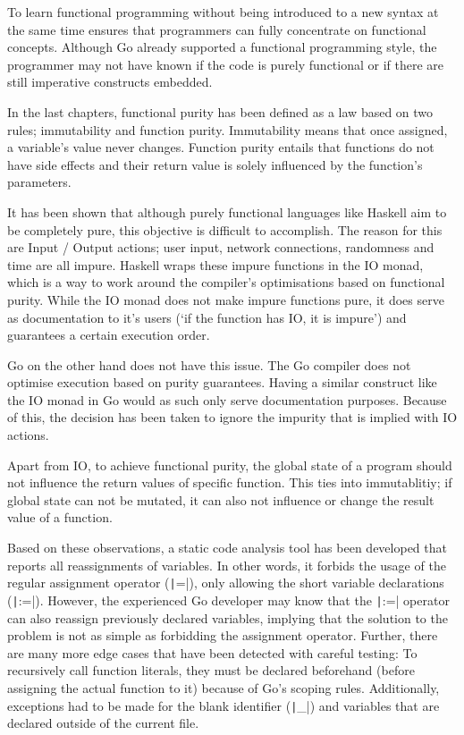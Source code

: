 
To learn functional programming without being introduced to a new syntax at the same time
ensures that programmers can fully concentrate on functional concepts. Although Go already
supported a functional programming style, the programmer may not have known if the code is
purely functional or if there are still imperative constructs embedded.

In the last chapters, functional purity has been defined as a law based on two rules; immutability
and function purity. Immutability means that once assigned, a variable's value never
changes. Function purity entails that functions do not have side effects and their return
value is solely influenced by the function's parameters.

It has been shown that although purely functional languages like Haskell aim to be completely
pure, this objective is difficult to accomplish. The reason for this are Input / Output actions; user
input, network connections, randomness and time are all impure. Haskell wraps
these impure functions in the IO monad, which is a way to work around the compiler's optimisations
based on functional purity. While the IO monad does not make impure functions pure, it
does serve as documentation to it's users (`if the function has IO, it is impure') and
guarantees a certain execution order.

Go on the other hand does not have this issue. The Go compiler does not optimise execution
based on purity guarantees. Having a similar construct like the IO monad in Go would as such
only serve documentation purposes. Because of this, the decision has been taken to ignore
the impurity that is implied with IO actions.

Apart from IO, to achieve functional purity, the global state of a program should not influence
the return values of specific function. This ties into immutablitiy; if global state can
not be mutated, it can also not influence or change the result value of a function.

Based on these observations, a static code analysis tool has been developed that reports
all reassignments of variables. In other words, it forbids the usage of the regular
assignment operator (\texttt|=|), only allowing the short variable declarations
(\texttt|:=|). However, the experienced Go developer may know that the \texttt|:=|
operator can also reassign previously declared variables, implying that the solution to the
problem is not as simple as forbidding the assignment operator.
Further, there are many more edge cases that have been detected with careful testing:
To recursively call function literals, they must be declared beforehand (before assigning
the actual function to it) because of Go's scoping rules. Additionally, exceptions
had to be made for the blank identifier (\texttt|_|) and variables that are declared
outside of the current file.

